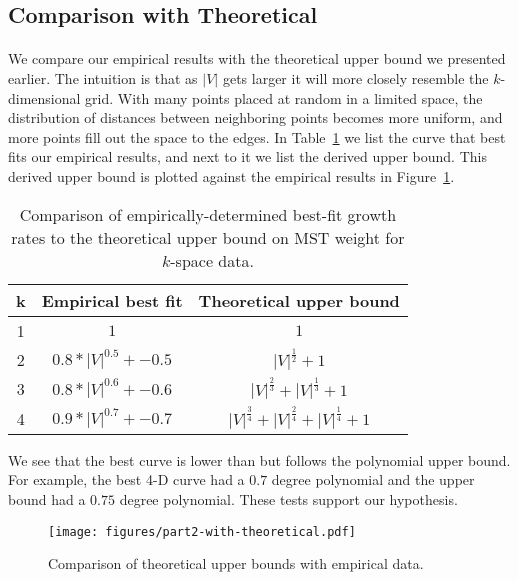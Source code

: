
\subsection{Comparison with Theoretical}
\label{sec:part2:compare}
\paragraph{}
We compare our empirical results with the theoretical upper bound we presented
earlier. The intuition is that as $|V|$ gets larger it will more closely resemble
the $k$-dimensional grid. With many points placed at random in a limited space,
the distribution of distances between neighboring points becomes more uniform,
and more points fill out the space to the edges. In
Table~\ref{table:part2-comparison} we list the curve that best fits our
empirical results, and next to it we list the derived upper bound.  This derived
upper bound is plotted against the empirical results in
Figure~\ref{fig:part2-with-theoretical}.

\begin{table}
\begin{tabular}{|c|c|c|}
\hline
k&Empirical best fit&Theoretical upper bound\\
\hline
1&$1$&$1$\\
2&$0.8*|V|^{0.5} + -0.5$&$|V|^{\frac{1}{2}} + 1$\\
3&$0.8*|V|^{0.6} + -0.6$&$|V|^{\frac{2}{3}} + |V|^{\frac{1}{3}} + 1$\\
4&$0.9*|V|^{0.7} + -0.7$&$|V|^{\frac{3}{4}} + |V|^{\frac{2}{4}} + |V|^{\frac{1}{4}} + 1$\\
\hline
\end{tabular}
\caption{Comparison of empirically-determined best-fit growth rates to the
  theoretical upper bound on MST weight for $k$-space data.}
\label{table:part2-comparison}
\end{table}

We see that the best curve is lower than but follows the polynomial upper
bound. For example, the best 4-D curve had a $0.7$ degree polynomial and the
upper bound had a $0.75$ degree polynomial. These tests support our
hypothesis.

\begin{figure}[htb!]
\centering
\texttt{[image: figures/part2-with-theoretical.pdf]}
\caption{Comparison of theoretical upper bounds with empirical data.}
\label{fig:part2-with-theoretical}
\end{figure}
